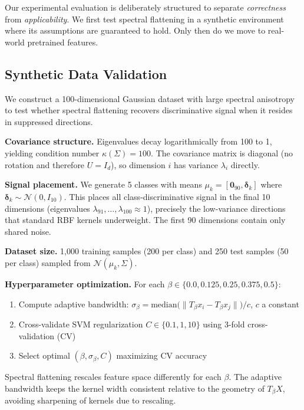 \documentclass{article}
\begin{document}
Our experimental evaluation is deliberately structured to separate \emph{correctness} from \emph{applicability}. We first test spectral flattening in a synthetic environment where its assumptions are guaranteed to hold. Only then do we move to real-world pretrained features.

\subsection{Synthetic Data Validation}

We construct a 100-dimensional Gaussian dataset with large spectral anisotropy to test whether spectral flattening recovers discriminative signal when it resides in suppressed directions.

\textbf{Covariance structure.} Eigenvalues decay logarithmically from 100 to 1, yielding condition number $\kappa(\Sigma) = 100$. The covariance matrix is diagonal (no rotation and therefore $U=I_d$), so dimension $i$ has variance $\lambda_i$ directly.

\textbf{Signal placement.} We generate 5 classes with means $\mu_k = [\mathbf{0}_{90}, \boldsymbol{\delta}_k]$ where $\boldsymbol{\delta}_k \sim \mathcal{N}(0, I_{10})$. This places all class-discriminative signal in the final 10 dimensions (eigenvalues $\lambda_{91}, \ldots, \lambda_{100} \approx 1$), precisely the low-variance directions that standard RBF kernels underweight. The first 90 dimensions contain only shared noise.

\textbf{Dataset size.} 1,000 training samples (200 per class) and 250 test samples (50 per class) sampled from $\mathcal{N}(\mu_k, \Sigma)$.

\textbf{Hyperparameter optimization.} For each $\beta \in \{0.0, 0.125, 0.25, 0.375, 0.5\}$:
\begin{enumerate}
    \item Compute adaptive bandwidth: $\sigma_\beta = \text{median}\big(\|T_\beta x_i - T_\beta x_j\|\big) / c$, $ c$ a constant
    \item Cross-validate SVM regularization $C \in \{0.1, 1, 10\}$ using 3-fold cross-validation (CV)
    \item Select optimal $(\beta, \sigma_\beta, C)$ maximizing CV accuracy
\end{enumerate}

Spectral flattening rescales feature space differently for each $\beta$. The adaptive bandwidth keeps the kernel width consistent relative to the geometry of $T_\beta X$, avoiding sharpening of kernels due to rescaling. 
\end{document}

